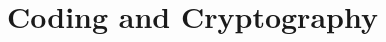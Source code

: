 \documentclass[main.tex]{subfiles}
\begin{document}
	\chapter{Coding and Cryptography}	
\end{document}
